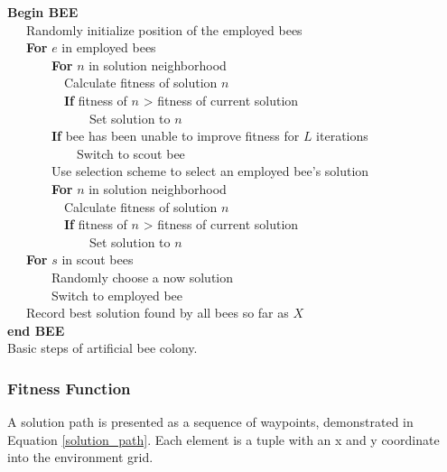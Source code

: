 \documentclass{tamuccthesis}
\begin{document}
\begin{algorithm}%
\textbf{Begin BEE}\\
~~~Randomly initialize position of the employed bees \\
~~~\textbf{For} $e$ in employed bees \\
~~~~~~~\textbf{For} $n$ in solution neighborhood \\
~~~~~~~~~Calculate fitness of solution $n$ \\
~~~~~~~~~\textbf{If} fitness of $n$ > fitness of current solution \\
~~~~~~~~~~~~~Set solution to $n$ \\
~~~~~~~\textbf{If} bee has been unable to improve fitness for $L$ iterations \\
~~~~~~~~~~~Switch to scout bee \\
~~~~~~~Use selection scheme to select an employed bee's solution \\
~~~~~~~\textbf{For} $n$ in solution neighborhood \\
~~~~~~~~~Calculate fitness of solution $n$ \\
~~~~~~~~~\textbf{If} fitness of $n$ > fitness of current solution \\
~~~~~~~~~~~~~Set solution to $n$ \\
~~~\textbf{For} $s$ in scout bees \\
~~~~~~~Randomly choose a now solution \\
~~~~~~~Switch to employed bee \\
~~~Record best solution found by all bees so far as $X$ \\
\textbf{end BEE}\\
\caption[Basic steps of artificial bee colony.]{Basic steps of artificial bee colony.} 
\label{BEE}
\end{algorithm}

\subsubsection{Fitness Function}
\label{section:fitness_function}

A solution path is presented as a sequence of waypoints, demonstrated in Equation \ref{solution_path}. Each element is a tuple with an x and y coordinate into the environment grid. 
\end{document}
